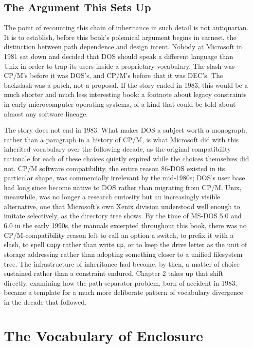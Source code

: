 \documentclass[11pt]{book}
\begin{document}
\section{The Argument This Sets Up}

The point of recounting this chain of inheritance in such detail is not antiquarian. It is to establish, before this book's polemical argument begins in earnest, the distinction between path dependence and design intent. Nobody at Microsoft in 1981 sat down and decided that DOS should speak a different language than Unix in order to trap its users inside a proprietary vocabulary. The slash was CP/M's before it was DOS's, and CP/M's before that it was DEC's. The backslash was a patch, not a proposal. If the story ended in 1983, this would be a much shorter and much less interesting book: a footnote about legacy constraints in early microcomputer operating systems, of a kind that could be told about almost any software lineage.

The story does not end in 1983. What makes DOS a subject worth a monograph, rather than a paragraph in a history of CP/M, is what Microsoft did with this inherited vocabulary over the following decade, as the original compatibility rationale for each of these choices quietly expired while the choices themselves did not. CP/M software compatibility, the entire reason 86-DOS existed in its particular shape, was commercially irrelevant by the mid-1980s; DOS's user base had long since become native to DOS rather than migrating from CP/M. Unix, meanwhile, was no longer a research curiosity but an increasingly visible alternative, one that Microsoft's own Xenix division understood well enough to imitate selectively, as the directory tree shows. By the time of MS-DOS 5.0 and 6.0 in the early 1990s, the manuals excerpted throughout this book, there was no CP/M-compatibility reason left to call an option a switch, to prefix it with a slash, to spell \texttt{copy} rather than write \texttt{cp}, or to keep the drive letter as the unit of storage addressing rather than adopting something closer to a unified filesystem tree. The infrastructure of inheritance had become, by then, a matter of choice sustained rather than a constraint endured. Chapter 2 takes up that shift directly, examining how the path-separator problem, born of accident in 1983, became a template for a much more deliberate pattern of vocabulary divergence in the decade that followed.

\chapter{The Vocabulary of Enclosure}
\end{document}
